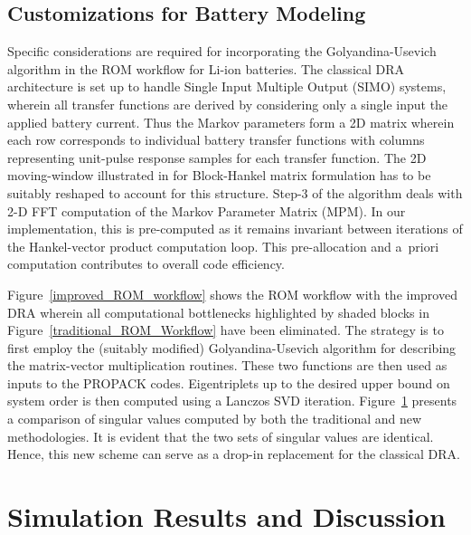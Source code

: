 \subsection{Customizations for Battery Modeling}

Specific considerations  are required  for incorporating  the Golyandina-Usevich
algorithm  in  the  ROM  workflow   for  Li-ion  batteries.  The  classical  DRA
architecture  is  set   up  to  handle  Single  Input   Multiple  Output  (SIMO)
systems,  wherein all  transfer  functions  are derived  by  considering only  a
single  input  \textendash{}  the  applied  battery  current.  Thus  the  Markov
parameters  form  a  2D  matrix  wherein  each  row  corresponds  to  individual
battery  transfer  functions  with   columns  representing  unit-pulse  response
samples   for  each   transfer  function.   The  2D   moving-window  illustrated
in   \citep{GolyandinaKorobeynikovShlemovEtAl2015}   for   Block-Hankel   matrix
formulation has  to be suitably reshaped  to account for this  structure. Step-3
of  the  algorithm deals  with  2-D  FFT  computation  of the  Markov  Parameter
Matrix  (MPM).  In  our  implementation,  this is  pre-computed  as  it  remains
invariant between iterations of the Hankel-vector product computation loop. This
pre-allocation and a~priori computation contributes to overall code efficiency.

Figure~\ref{improved_ROM_workflow} shows the ROM workflow with
the improved DRA wherein all computational bottlenecks highlighted
by shaded blocks in Figure~\ref{traditional_ROM_Workflow} have
been eliminated. The strategy is to first employ the (suitably modified)
Golyandina-Usevich algorithm for describing the matrix-vector multiplication
routines. These two functions are then used as inputs to the PROPACK
codes. Eigentriplets up to the desired upper bound on system order
is then computed using a Lanczos SVD iteration. Figure~\ref{svdcompare}
presents a comparison of singular values computed by both the  traditional
and new methodologies. It is evident that the two sets of singular
values are identical. Hence, this new scheme can serve as a drop-in
replacement for the classical DRA.

\begin{figure}
	\caption{}
	\label{svdcompare}
\end{figure}

\section{Simulation Results and Discussion\label{sec:Results} }

